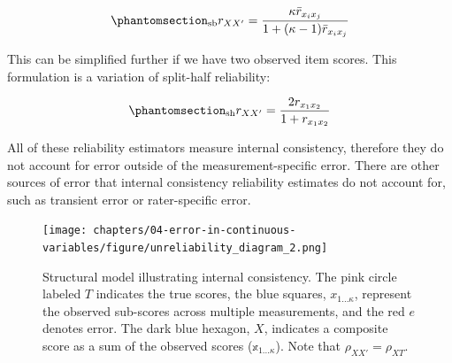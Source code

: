 \documentclass[
  letterpaper,
  DIV=11,
  numbers=noendperiod]{scrreprt}
\begin{document}
\begin{equation}\phantomsection\label{eq-sp-brown}{
_\text{sb} r_{XX'}= \frac{\kappa \bar{r}_{x_i x_j}}{1+(\kappa-1)\bar{r}_{x_i x_j}}
}\end{equation}

This can be simplified further if we have two observed item scores. This
formulation is a variation of split-half reliability:

\begin{equation}\phantomsection\label{eq-split-half}{
_\text{sh}r_{XX'}= \frac{2r_{x_1 x_2}}{1+r_{x_1 x_2}}
}\end{equation}

All of these reliability estimators measure internal consistency,
therefore they do not account for error outside of the
measurement-specific error. There are other sources of error that
internal consistency reliability estimates do not account for, such as
transient error or rater-specific error.

\begin{figure}[H]

{\centering \texttt{[image: chapters/04-error-in-continuous-variables/figure/unreliability\_diagram\_2.png]}

}

\caption{Structural model illustrating internal consistency. The pink
circle labeled \(T\) indicates the true scores, the blue squares,
\(x_{1...\kappa}\), represent the observed sub-scores across multiple
measurements, and the red \(e\) denotes error. The dark blue hexagon,
\(X\), indicates a composite score as a sum of the observed scores
(\(\mathbb{x}_{1...\kappa}\)). Note that \(\rho_{XX'}=\rho_{XT}\).}

\end{figure}%
\end{document}
